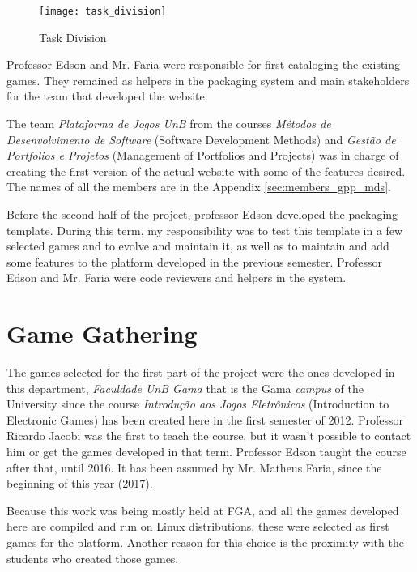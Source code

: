 \begin{figure}[h!]
\centering
\texttt{[image: task\_division]}
\caption{Task Division}
\label{fig:task_division}
\end{figure}

Professor Edson and Mr. Faria were responsible for first cataloging the existing games. They remained as helpers in the packaging system and main stakeholders for the team that developed the website.

The team \textit{Plataforma de Jogos UnB} from the courses \textit{M\'etodos de Desenvolvimento de Software} (Software Development Methods) and \textit{Gest\~ao de Portfolios e Projetos} (Management of Portfolios and Projects) was in charge of creating the first version of the actual website with some of the features desired. The names of all the members are in the Appendix \ref{sec:members_gpp_mds}.

Before the second half of the project, professor Edson developed the packaging template. During this term, my responsibility was to test this template in a few selected games and to evolve and maintain it, as well as to maintain and add some features to the platform developed in the previous semester. Professor Edson and Mr. Faria were code reviewers and helpers in the system.


\section{Game Gathering}
\label{sec:game_gathering}

The games selected for the first part of the project were the ones developed in this department, \textit{Faculdade UnB Gama} that is the Gama \textit{campus} of the University since the course \textit{Introdu\c{c}\~ao aos Jogos Eletr\^onicos} (Introduction to Electronic Games) has been created here in the first semester of 2012. Professor Ricardo Jacobi was the first to teach the course, but it wasn't possible to contact him or get the games developed in that term. Professor Edson taught the course after that, until 2016. It has been assumed by Mr. Matheus Faria, since the beginning of this year (2017).

Because this work was being mostly held at FGA, and all the games developed here are compiled and run on Linux distributions, these were selected as first games for the platform. Another reason for this choice is the proximity with the students who created those games.

